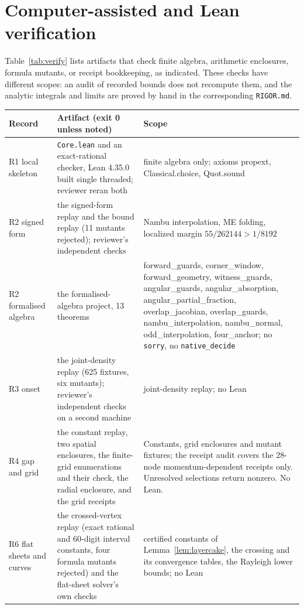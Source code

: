 \documentclass[11pt]{article}
\theoremstyle{definition}
\theoremstyle{remark}
\begin{document}
\section{Computer-assisted and Lean verification}\label{sec:verification}

Table~\ref{tab:verify} lists artifacts that check finite algebra, arithmetic enclosures, formula mutants, or receipt bookkeeping, as indicated. These checks have different scopes: an audit of recorded bounds does not recompute them, and the analytic integrals and limits are proved by hand in the corresponding \texttt{RIGOR.md}.

\begin{table}[t]
\centering\small
\begin{tabular}{@{}>{\raggedright\arraybackslash}p{2.9cm}>{\raggedright\arraybackslash}p{5.1cm}>{\raggedright\arraybackslash}p{5.0cm}@{}}
\toprule
Record & Artifact (exit 0 unless noted) & Scope\\\midrule
R1 local skeleton & \texttt{Core.lean} and an exact-rational checker, Lean 4.35.0 built single threaded; reviewer reran both & finite algebra only; axioms propext, Classical.choice, Quot.sound\\
R2 signed form & the signed-form replay and the bound replay (11 mutants rejected); reviewer's independent checks & Nambu interpolation, ME folding, localized margin $55/262144>1/8192$\\
R2 formalised algebra & the formalised-algebra project, 13 theorems & forward\_guards, corner\_window, forward\_geometry, witness\_guards, angular\_guards, angular\_absorption, angular\_partial\_fraction, overlap\_jacobian, overlap\_guards, nambu\_interpolation, nambu\_normal, odd\_interpolation, four\_anchor; no \texttt{sorry}, no \texttt{native\_decide}\\
R3 onset & the joint-density replay (625 fixtures, six mutants); reviewer's independent checks on a second machine & joint-density replay; no Lean\\
R4 gap and grid
 & the constant replay, two spatial enclosures, the finite-grid enumerations and their check, the radial enclosure, and the grid receipts & Constants, grid enclosures and mutant fixtures; the receipt audit covers the 28-node momentum-dependent receipts only. Unresolved selections return nonzero. No Lean.\\
R6 flat sheets and curves & the crossed-vertex replay (exact rational and 60-digit interval constants, four formula mutants rejected) and the flat-sheet solver's own checks & certified constants of Lemma~\ref{lem:layercake}, the crossing and its convergence tables, the Rayleigh lower bounds; no Lean\\

\end{tabular}
\end{table}
\end{document}
